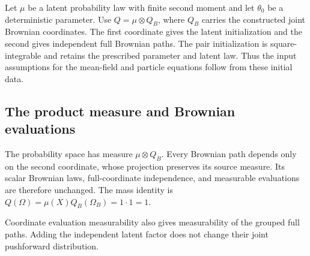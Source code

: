 \documentclass[11pt,a4paper]{report}
\begin{document}
Let \(\mu\) be a latent probability law with finite second moment and let \(\theta_0\) be a deterministic parameter. Use \(Q=\mu\otimes Q_B\), where \(Q_B\) carries the constructed joint Brownian coordinates. The first coordinate gives the latent initialization and the second gives independent full Brownian paths. The pair initialization is square-integrable and retains the prescribed parameter and latent law. Thus the input assumptions for the mean-field and particle equations follow from these initial data.

\subsection{\texorpdfstring{The product measure and Brownian evaluations}{The product measure and Brownian evaluations}}
\label{report-step-ProximalLangevin-MeanFieldInitialSource-lean-1}


The probability space has measure \(\mu\otimes Q_B\). Every Brownian path depends only on the second coordinate, whose projection preserves its source measure. Its scalar Brownian laws, full-coordinate independence, and measurable evaluations are therefore unchanged. The mass identity is \(Q(\Omega)=\mu(X)Q_B(\Omega_B)=1\cdot1=1\).



Coordinate evaluation measurability also gives measurability of the grouped full paths. Adding the independent latent factor does not change their joint pushforward distribution.
\end{document}
